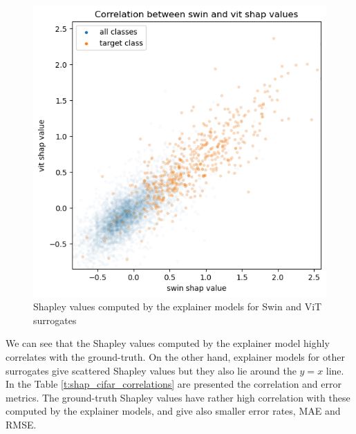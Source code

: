 \documentclass[magisterska,en]{pracamgr}
\begin{document}
\begin{figure}[H]
\centering
\includegraphics[scale=0.5]{./images/swin_vit_cifar.png}
\caption{Shapley values computed by the explainer models for Swin and ViT surrogates}
\label{swin_vit_cifar}
\end{figure}

We can see that the Shapley values computed by the explainer model highly correlates with the ground-truth. On the other hand, explainer models for other surrogates give scattered Shapley values but they also lie around the $y=x$ line. In the Table \ref{t:shap_cifar_correlations} are presented the correlation and error metrics. The ground-truth Shapley values have rather high correlation with these computed by the explainer models, and give also smaller error rates, MAE and RMSE.
\end{document}
